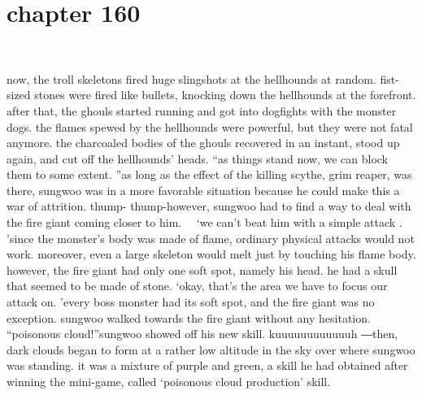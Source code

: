 \section{chapter 160}

                             




now, the troll skeletons fired huge slingshots at the hellhounds at random.
 fist-sized stones were fired like bullets, knocking down the hellhounds at the forefront.
after that, the ghouls started running and got into dogfights with the monster dogs.
the flames spewed by the hellhounds were powerful, but they were not fatal anymore.
the charcoaled bodies of the ghouls recovered in an instant, stood up again, and cut off the hellhounds’ heads.
“as things stand now, we can block them to some extent.
”as long as the effect of the killing scythe, grim reaper, was there, sungwoo was in a more favorable situation because he could make this a war of attrition.
thump- thump-however, sungwoo had to find a way to deal with the fire giant coming closer to him.
  ‘we can’t beat him with a simple attack .
’since the monster’s body was made of flame, ordinary physical attacks would not work.
 moreover, even a large skeleton would melt just by touching his flame body.
however, the fire giant had only one soft spot, namely his head.
 he had a skull that seemed to be made of stone.
‘okay, that’s the area we have to focus our attack on.
’every boss monster had its soft spot, and the fire giant was no exception.
sungwoo walked towards the fire giant without any hesitation.
“poisonous cloud!”sungwoo showed off his new skill.
kuuuuuuuuuuuuh ―then, dark clouds began to form at a rather low altitude in the sky over where sungwoo was standing.
 it was a mixture of purple and green, a skill he had obtained after winning the mini-game, called ‘poisonous cloud production’ skill.

